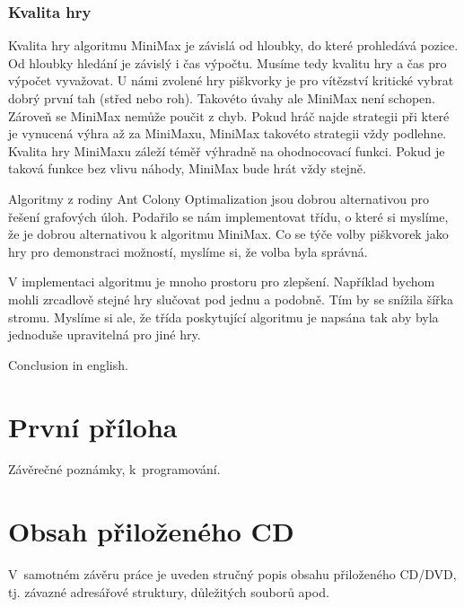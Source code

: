 \documentclass[12pt]{article}
\begin{document}
\subsubsection{Kvalita hry}
Kvalita hry algoritmu MiniMax je závislá od hloubky, do které prohledává pozice. Od hloubky hledání je závislý i čas výpočtu. Musíme tedy kvalitu hry a čas pro výpočet vyvažovat. U námi zvolené hry piškvorky je pro vítězství kritické vybrat dobrý první tah (střed nebo roh). Takovéto úvahy ale MiniMax není schopen. Zárove\v{n} se MiniMax nemůže poučit z chyb. Pokud hráč najde strategii při které je vynucená výhra až za  MiniMaxu, MiniMax takovéto strategii vždy podlehne. Kvalita hry MiniMaxu záleží téměř výhradně na ohodnocovací funkci. Pokud je taková funkce bez vlivu náhody, MiniMax bude hrát vždy stejně.

\begin{conclusions-cz}
Algoritmy z rodiny Ant Colony Optimalization jsou dobrou alternativou pro řešení grafových úloh. Podařilo se nám implementovat třídu, o které si myslíme, že je dobrou alternativou k algoritmu MiniMax. Co se týče volby piškvorek jako hry pro demonstraci možností, myslíme si, že volba byla správná. 

V implementaci algoritmu je mnoho prostoru pro zlepšení. Například bychom mohli zrcadlově stejné hry slučovat pod jednu a podobně. Tím by se snížila šířka stromu. Myslíme si ale, že třída poskytující algoritmu je napsána tak aby byla jednoduše upravitelná pro jiné hry.
\end{conclusions-cz}


\begin{conclusions-en}
  Conclusion in english. 
\end{conclusions-en}


\newpage



\newpage
\appendix

\section{První příloha} \label{PrvniPriloha}
Závěrečné poznámky, k~programování.

\newpage
\section{Obsah přiloženého CD} \label{ObsahCD}
V~samotném závěru práce je uveden stručný popis obsahu přiloženého
CD/DVD, tj. závazné adresářové struktury, důležitých souborů apod.
\end{document}
